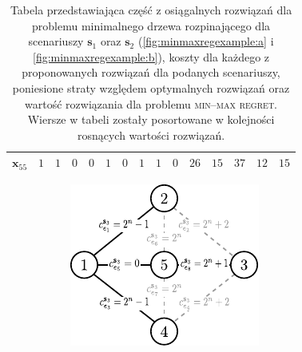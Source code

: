 \begin{table}[!htbp]
\begin{tabular}{ccccccccccccccc}
		$\textbf{x}_{55}$ & $1$     & $1$     & $0$     & $0$     & $1$     & $0$     & $1$     & $1$	&	$0$	&	$26$	&	$15$	&	$37$	&	$12$	&	$15$	\\
		\hline
	\end{tabular}
	\caption{Tabela przedstawiająca część z osiągalnych rozwiązań dla problemu minimalnego drzewa rozpinającego dla scenariuszy $\textbf{s}_{1}$ oraz $\textbf{s}_{2}$ (\ref{fig:minmaxregexample:a} i \ref{fig:minmaxregexample:b}), koszty dla każdego z proponowanych rozwiązań dla podanych scenariuszy, poniesione straty względem optymalnych rozwiązań oraz wartość rozwiązania dla problemu \textsc{min--max regret}. Wiersze w tabeli zostały posortowane w kolejności rosnących wartości rozwiązań.}
	\label{tab:minmaxregexample2}
\end{table}

\begin{figure}[!htbp]
	\null\hfill
	\begin{subfigure}[b]{0.3\textwidth}
		\includegraphics[width=\textwidth]{Chapter_II/MIN-MAX-REG2-example/a}
		\caption{}
		\label{fig:minmaxregexample2:a}
	\end{subfigure}
	\hfill
	\begin{subfigure}[b]{0.3\textwidth}

\end{subfigure}
\end{figure}
